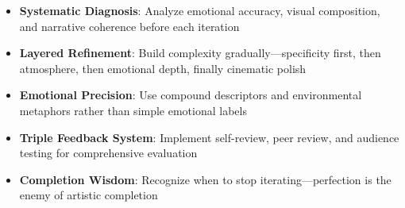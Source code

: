 \begin{itemize}
\item \textbf{Systematic Diagnosis}: Analyze emotional accuracy, visual composition, and narrative coherence before each iteration
\item \textbf{Layered Refinement}: Build complexity gradually—specificity first, then atmosphere, then emotional depth, finally cinematic polish
\item \textbf{Emotional Precision}: Use compound descriptors and environmental metaphors rather than simple emotional labels
\item \textbf{Triple Feedback System}: Implement self-review, peer review, and audience testing for comprehensive evaluation
\item \textbf{Completion Wisdom}: Recognize when to stop iterating—perfection is the enemy of artistic completion
\end{itemize}
